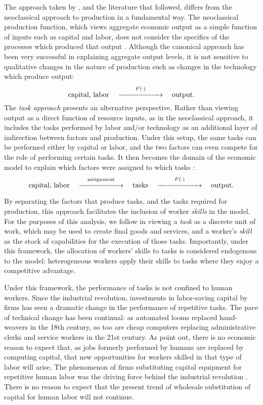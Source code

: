 The approach taken by \citet{Levy2003}, and the literature that followed, differs from the neoclassical approach to production in a fundamental way. The neoclassical production function, which views aggregate economic output as a simple function of inputs such as capital and labor, does not consider the specifics of the processes which produced that output \citep{Acemoglu2011}. Although the canonical approach has been very successful in explaining aggregate output levels, it is not sensitive to qualitative changes in the nature of production such as changes in the technology which produce output:
\[ \text{capital, labor} \quad \overset{F(\cdot)}{\xrightarrow{\hspace*{2cm}}} \quad \text{output}. \]
The {\em task approach} presents an alternative perspective. Rather than viewing output as a direct function of resource inputs, as in the neoclassical approach, it includes the tasks performed by labor and/or technology as an additional layer of indirection between factors and production. Under this setup, the same tasks can be performed either by capital or labor, and the two factors can even compete for the role of performing certain tasks. It then becomes the domain of the economic model to explain which factors were assigned to which tasks \citep{Autor2013,Acemoglu2011}:
\[ \text{capital, labor} \quad \overset{\text{assignment}}{\xrightarrow{\hspace*{2cm}}} \quad \text{tasks} \quad \overset{F(\cdot)}{\xrightarrow{\hspace*{2cm}}} \quad \text{output}. \]

By separating the factors that produce tasks, and the tasks required for production, this approach facilitates the inclusion of worker \emph{skills} in the model. For the purposes of this analysis, we follow \citet{Autor2013} in viewing a \emph{task} as a discrete unit of work, which may be used to create final goods and services, and a worker's \emph{skill} as the stock of capabilities for the execution of those tasks. Importantly, under this framework, the allocation of workers' skills to tasks is considered endogenous to the model: heterogeneous workers apply their skills to tasks where they enjoy a competitive advantage.

Under this framework, the performance of tasks is not confined to human workers. Since the industrial revolution, investments in labor-saving capital by firms has seen a dramatic change in the performance of repetitive tasks. The pace of technical change has been continual: as automated looms replaced hand-weavers in the 18th century, so too are cheap computers replacing administrative clerks and service workers in the 21st century. As \citet{Brynjolfsson2011} point out, there is no economic reason to expect that, as jobs formerly performed by humans are replaced by computing capital, that new opportunities for workers skilled in that type of labor will arise. The phenomenon of firms substituting capital equipment for repetitive human labor was the driving force behind the industrial revolution \citep{Goldin1998}. There is no reason to expect that the present trend of wholesale substitution of capital for human labor will not continue.

